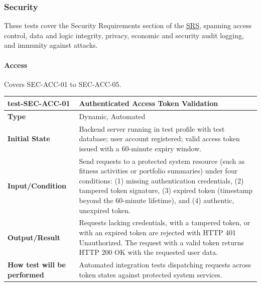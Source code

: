 \documentclass[12pt, titlepage]{article}
\begin{document}
\subsubsection{Security}

These tests cover the Security Requirements section of the \href{https://github.com/arjunkarthik123/fitness-finance-application/blob/main/pdfs/SRS-Volere/SRS.pdf}{SRS}, spanning access control, data and logic integrity, privacy, economic and security audit logging, and immunity against attacks.

\paragraph{Access}

Covers SEC-ACC-01 to SEC-ACC-05.

\noindent\begin{tabularx}{\textwidth}{>{\raggedright\arraybackslash}p{3.5cm}X}
  \toprule
  \textbf{test-SEC-ACC-01} & \textbf{Authenticated Access Token Validation}\\
  \midrule
  \textbf{Type} & Dynamic, Automated\\
  \textbf{Initial State} & Backend server running in test profile with test database; user account registered; valid access token issued with a 60-minute expiry window.\\
  \textbf{Input/Condition} & Send requests to a protected system resource (such as fitness activities or portfolio summaries) under four conditions: (1) missing authentication credentials, (2) tampered token signature, (3) expired token (timestamp beyond the 60-minute lifetime), and (4) authentic, unexpired token.\\
  \textbf{Output/Result} & Requests lacking credentials, with a tampered token, or with an expired token are rejected with HTTP 401 Unauthorized. The request with a valid token returns HTTP 200 OK with the requested user data.\\
  \textbf{How test will be performed} & Automated integration tests dispatching requests across token states against protected system services.\\
  \bottomrule
\end{tabularx}

\vspace{1em}
\end{document}

